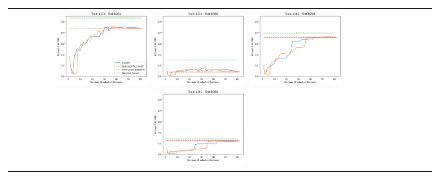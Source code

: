 \begin{figure}[h!]
\begin{tabular}{cccc}
  \includegraphics[width=0.25\textwidth]{Kap5/linear_ALL_METHODS_train=b234test=b261}  \includegraphics[width=0.25\textwidth]{Kap5/linear_ALL_METHODS_train=b234test=b360}
  \includegraphics[width=0.25\textwidth]{Kap5/linear_ALL_METHODS_train=b261test=b278}  \includegraphics[width=0.25\textwidth]{Kap5/linear_ALL_METHODS_train=b261test=b360} \\


\end{tabular}
\end{figure}
